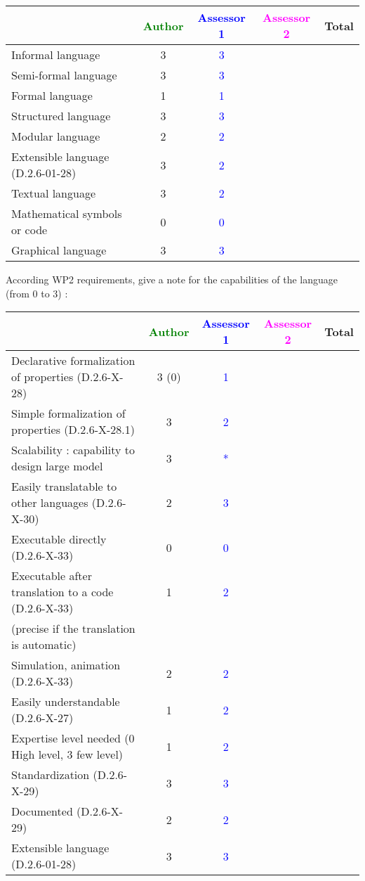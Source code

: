 \begin{tabular}{|l | c | c | c | c|}
\hline
& \textcolor{green}{Author} & \textcolor{blue}{Assessor 1} & \textcolor{magenta}{Assessor 2} & Total \\
\hline
Informal language & 3 & \textcolor{blue}{3} & & \\
\hline
Semi-formal language & 3 & \textcolor{blue}{3} & & \\
\hline
Formal language & 1 & \textcolor{blue}{1} & & \\
\hline
Structured language & 3 & \textcolor{blue}{3} & & \\
\hline
Modular language & 2 & \textcolor{blue}{2} & & \\
\hline
Extensible language (D.2.6-01-28) & 3 & \textcolor{blue}{2} & & \\
\hline
Textual language & 3 & \textcolor{blue}{2} & & \\
\hline
Mathematical symbols or code & 0 & \textcolor{blue}{0} & & \\
\hline
Graphical language & 3 & \textcolor{blue}{3} & & \\
\hline
\end{tabular}

According WP2 requirements, give a note for the capabilities of the language (from 0 to 3) :

\begin{tabular}{|l | c | c | c | c|}
\hline
& \textcolor{green}{Author} & \textcolor{blue}{Assessor 1} & \textcolor{magenta}{Assessor 2} & Total \\
\hline
Declarative formalization of properties (D.2.6-X-28) & 3 (0) & \textcolor{blue}{1} & & \\
\hline
Simple formalization of properties (D.2.6-X-28.1) & 3 &  \textcolor{blue}{2} & & \\
\hline
Scalability : capability to design large model & 3 & \textcolor{blue}{*} & & \\
\hline
Easily translatable to other languages (D.2.6-X-30) & 2 & \textcolor{blue}{3} & & \\
\hline
Executable directly (D.2.6-X-33) & 0 & \textcolor{blue}{0} & & \\
\hline
Executable after translation to a code (D.2.6-X-33) & 1 & \textcolor{blue}{2} & & \\
(precise if the translation is automatic) & & & & \\
\hline
Simulation, animation (D.2.6-X-33) & 2 & \textcolor{blue}{2} & & \\
\hline
Easily understandable (D.2.6-X-27) & 1 & \textcolor{blue}{2} & & \\
\hline
Expertise level needed (0 High level, 3 few level) & 1 & \textcolor{blue}{2} & & \\
\hline
Standardization (D.2.6-X-29) & 3 & \textcolor{blue}{3} & & \\
\hline
Documented (D.2.6-X-29) & 2 & \textcolor{blue}{2} & & \\
\hline
Extensible language (D.2.6-01-28) & 3 & \textcolor{blue}{3} & & \\
\hline
\end{tabular}

